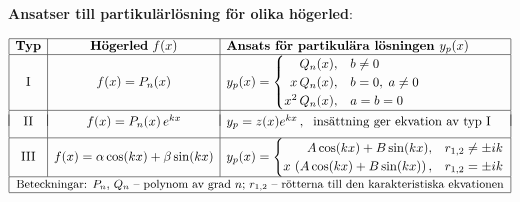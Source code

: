 \documentclass{article}
\begin{document}
{\textbf{Ansatser till partikulärlösning för olika högerled}:


\medskip

$\begin{array}{|c|c|l|}\hline %
  \text{\textbf {Typ}}&
  \text{\bf Högerled} \ f(x)&
  \text{\bf Ansats för partikulära lösningen $y_p(x)$}\\
  \hline
  \text{I}&f(x)=P_n(x) & y_p(x) =
  \begin{cases}
    \hfill Q_n(x),       & b\neq0\\
    \hfill x\, Q_n(x),   & b=0, \; a\neq0\\
    \hfill x^2\, Q_n(x), & a=b=0\\
  \end{cases}
  \\
  \hline & & \\*[-9pt]
  \text{II}&f(x)=P_n(x)\,e^{kx}&y_p=z(x)e^{kx}\,,\;
   \text{ insättning ger ekvation av typ I}\EndRow
  \hline
  \text{III}&f(x)=\alpha\cos(kx)+\beta\sin(kx)
  &y_p(x) =
  \begin{cases}
    \hfill A\cos(kx)+B\sin(kx),                 & r_{1,2}\neq\pm ik  \\
    \hfill x\,\left(A\cos(kx)+B\sin(kx)\right), & r_{1,2}=\pm ik
  \end{cases} \\
  \hline\multicolumn{3}{|c|}{
  \text{\small Beteckningar: $P_n$, $Q_n$ -- polynom av grad $n$; $r_{1,2}$
   -- rötterna till den karakteristiska ekvationen}
  } \\
\hline
\end{array}$
}

\label{LastPageNo}
\end{document}
